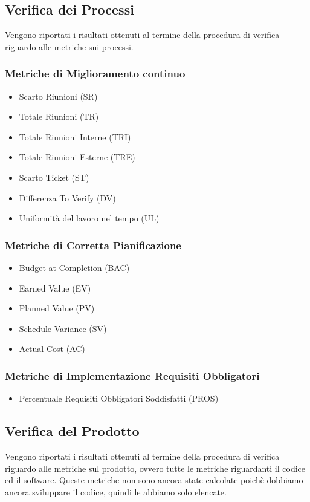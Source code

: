 \subsection{Verifica dei Processi}
Vengono riportati i risultati ottenuti al termine della procedura di verifica riguardo alle metriche sui processi.
\subsubsection{Metriche di Miglioramento continuo}
\begin{itemize}
	\item Scarto Riunioni (SR)
	\item Totale Riunioni (TR)
	\item Totale Riunioni Interne (TRI)
	\item Totale Riunioni Esterne (TRE)
	\item Scarto Ticket (ST)
	\item Differenza To Verify (DV)
	\item Uniformità del lavoro nel tempo (UL)
\end{itemize}
\subsubsection{Metriche di Corretta Pianificazione}
\begin{itemize}
	\item Budget at Completion (BAC)
	\item Earned Value (EV)
	\item Planned Value (PV)
	\item Schedule Variance (SV)
	\item Actual Cost (AC)
\end{itemize}
\subsubsection{Metriche di Implementazione Requisiti Obbligatori}
\begin{itemize}
	\item Percentuale Requisiti Obbligatori Soddisfatti (PROS)
\end{itemize}
\pagebreak
\subsection{Verifica del Prodotto}
Vengono riportati i risultati ottenuti al termine della procedura di verifica riguardo alle metriche sul prodotto, ovvero tutte le metriche riguardanti il codice ed il software.
Queste metriche non sono ancora state calcolate poichè dobbiamo ancora sviluppare il codice, quindi le abbiamo solo elencate.
